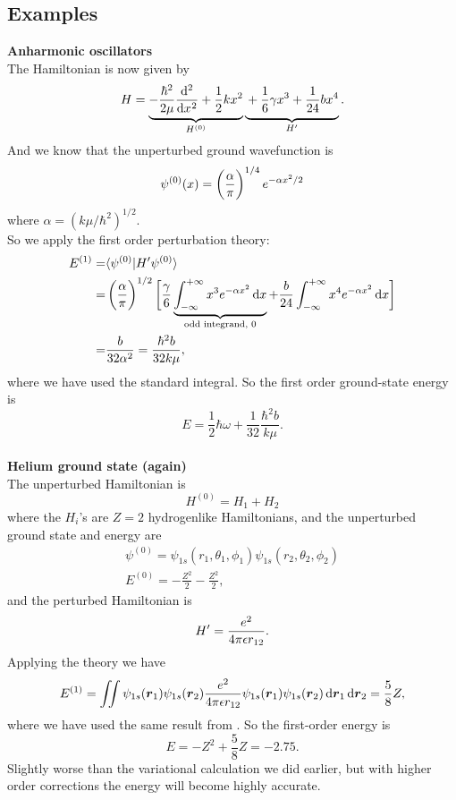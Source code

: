 \subsection{Examples}
\textbf{Anharmonic oscillators}\\
The Hamiltonian is now given by 
\begin{equation}
H=\underbrace{-\frac{\hbar^2}{2\mu}\diff[2]{}{x}+\frac{1}{2}kx^2}_{H^{(0)}}\underbrace{\vphantom{-\frac{\hbar^2}{2\mu}\diff[2]{}{x}+\frac{1}{2}kx^2}+\frac{1}{6}\gamma x^3+\frac{1}{24}bx^4}_{H'}.
\end{equation}
And we know that the unperturbed ground wavefunction is
\begin{equation}
\psi^{(0)}(x)=\left(\frac{\alpha}{\pi}\right)^{1/4}e^{-\alpha x^2/2}
\end{equation}
where $\alpha=(k\mu/\hbar^2)^{1/2}$. \\
So we apply the first order perturbation theory:
\begin{equation}
\begin{aligned}
E^{(1)}=&\lgl \psi^{(0)}|H'\psi^{(0)} \rgl\\
=&\lf(\frac{\alpha}{\pi}\rt)^{1/2}\bigg[\frac{\gamma}{6}\underbrace{\intinf x^3e^{-\alpha x^2}\dx}_{\text{odd integrand, }0}+\frac{b}{24}\intinf x^4e^{-\alpha x^2}\dx \bigg]\\
=&\frac{b}{32\alpha^2}=\frac{\hbar^2b}{32k\mu}, 
\end{aligned}
\end{equation}
where we have used the standard integral. So the first order ground-state energy is 
\begin{equation}
E=\frac{1}{2}\hbar\omega+\frac{1}{32}\frac{\hbar^2b}{k\mu}.
\end{equation}
\ \\
\textbf{Helium ground state (again)}\\
The unperturbed Hamiltonian is 
\begin{equation}
H^{(0)}=H_1+H_2
\end{equation}
where the $H_i$'s are $Z=2$ hydrogenlike Hamiltonians, and the unperturbed ground state and energy are
\begin{equation}
\begin{aligned}
\psi^{(0)}=\psi_{1s}(r_1,\theta_1,\phi_1)\psi_{1s}(r_2,\theta_2,\phi_2)\\
E^{(0)}=-\frac{Z^2}{2}-\frac{Z^2}{2},
\end{aligned}
\end{equation}
and the perturbed Hamiltonian is 
\begin{equation}
H'=\frac{e^2}{4\pi\epsilon r_{12}}.
\end{equation}
Applying the theory we have
\begin{equation}
E^{(1)}=\iint\psi_{1s}(\bvec{r}_1)\psi_{1s}(\bvec{r}_2)\frac{e^2}{4\pi\ep r_{12}}\psi_{1s}(\bvec{r}_1)\psi_{1s}(\bvec{r}_2)\dif\bvec{r}_1\dif\bvec{r}_2=\frac{5}{8}Z,
\end{equation}
where we have used the same result from . So the first-order energy is 
\begin{equation}
E=-Z^2+\frac{5}{8}Z=-2.75.
\end{equation}
Slightly worse than the variational calculation we did earlier, but with higher 
order corrections the energy will become highly accurate. 

